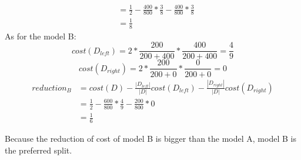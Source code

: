 \documentclass[paper=a4, fontsize=11pt]{scrartcl} %
\numberwithin{equation}{section} %
\numberwithin{figure}{section} %
\numberwithin{table}{section} %
\begin{document}
\begin{itemize}
\begin{align*}
		\\ &=\frac{1}{2}-\frac{400}{800}*\frac{3}{8}-\frac{400}{800}*\frac{3}{8}
		\\ &=\frac{1}{8}
		\end{align*}
		As for the model B:
		\begin{equation*}
		cost\left ( D_{left} \right )=2*\frac{200}{200+400}*\frac{400}{200+400}=\frac{4}{9}
		\end{equation*}
		\begin{equation*}
		cost\left ( D_{right} \right )=2*\frac{200}{200+0}*\frac{0}{200+0}=0
		\end{equation*}
		\begin{align*}
		reduction_{B}&=cost\left ( D \right )-\frac{\left | D_{left} \right |}{\left | D \right |}cost\left ( D_{left} \right )-\frac{\left | D_{right} \right |}{\left | D \right |}cost\left ( D_{right} \right )
		\\ &=\frac{1}{2}-\frac{600}{800}*\frac{4}{9}-\frac{200}{800}*0
		\\ &=\frac{1}{6}
		\end{align*}
\end{itemize}
Because the reduction of cost of model B is bigger than the model A, model B is the preferred split.
\end{document}
